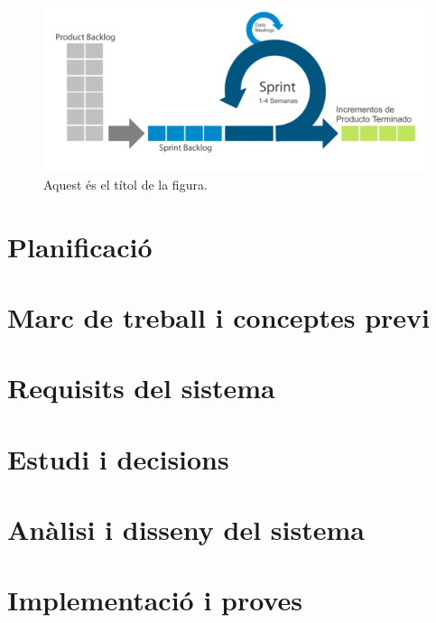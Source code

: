 \documentclass[a4paper,12pt,twoside]{ThesisStyle}
\begin{document}
\begin{figure}[h] %
  \centering
  \includegraphics[width=\linewidth]{imatges/scrum.png} %
  \caption{Aquest és el títol de la figura.}
  \label{fig:exemple_figura}
\end{figure}




\chapter{Planificació}
\label{chp:planificació}





\chapter{Marc de treball i conceptes previ}
\label{chp:marcdetreball}



\chapter{Requisits del sistema}
\label{chp:requisits}



\chapter{Estudi i decisions}
\label{chp:estudi}



\chapter{Anàlisi i disseny del sistema}
\label{chp:analisi}



\chapter{Implementació i proves}
\label{chp:implementacio}
\end{document}
